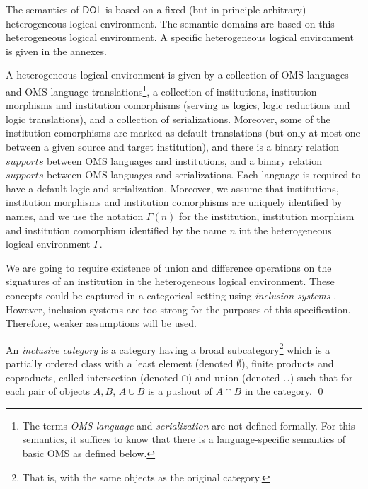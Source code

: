 \documentclass[10pt, a4paper]{isov2}
\newcommand*{\termref}[1]{\index{#1}#1\xspace}
\newcommand*{\DOL}{\ensuremath{\mathsf{DOL}}\xspace}
\begin{document}

\sclause{Semantics of \DOL Language Constructs}\label{c:direct-sematics}

The semantics of \DOL is based on a fixed (but in principle arbitrary) heterogeneous logical 
environment.  The semantic domains are based on this heterogeneous logical environment. 
A specific heterogeneous logical environment is given in the annexes.

A heterogeneous logical environment is given by a collection of
OMS languages and OMS language translations\footnote{The
  terms \emph{OMS language} and \emph{serialization} are not
  defined formally. For this semantics, it suffices to know that there
  is a language-specific semantics of basic OMS as defined
  below.}, a collection of institutions, \termref{institution} morphisms and
institution comorphisms (serving as logics, logic reductions and logic
translations), and a collection of serializations. Moreover, some of the institution comorphisms are marked as default translations (but only at most one between a given source and target institution), and there is
a binary relation $\mathit{supports}$ between OMS languages and institutions,
and a binary relation $\mathit{supports}$ between OMS languages and
serializations. 
 Each language is required to have a default logic and serialization. Moreover, we assume
 that institutions, institution morphisms and institution comorphisms
 are uniquely identified by names, and we use
 the notation $\Gamma(n)$ for the institution, institution morphism and institution comorphism identified by the name $n$ int the heterogeneous logical environment $\Gamma$.

We are going to require existence of union and difference operations on the signatures
of an institution in the heterogeneous logical environment.
These concepts could be captured in a categorical setting using \emph{inclusion systems} \cite{DGS91}.
 However, inclusion systems are too strong for the purposes of this specification.  Therefore, weaker assumptions will be used.

\begin{definition}  
 An \emph{inclusive category} \cite{DBLP:conf/birthday/GoguenR04} 
 is a category having a broad subcategory\footnote{That is, with the same objects as the original category.}
which is a partially ordered class with 
a least element (denoted $\emptyset$),
finite products and coproducts, called intersection (denoted $\cap$) and union
(denoted $\cup$) such that for each pair of objects $A, B$, $A \cup B$ is a pushout of $A \cap B$ in the category.
\qed \end{definition}
\end{document}
